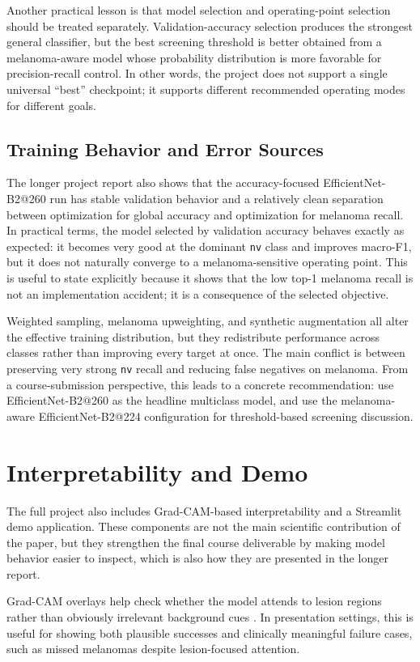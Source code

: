 \documentclass[conference]{IEEEtran}
\begin{document}
Another practical lesson is that model selection and operating-point selection should be treated separately. Validation-accuracy selection produces the strongest general classifier, but the best screening threshold is better obtained from a melanoma-aware model whose probability distribution is more favorable for precision-recall control. In other words, the project does not support a single universal ``best'' checkpoint; it supports different recommended operating modes for different goals.

\subsection{Training Behavior and Error Sources}
The longer project report also shows that the accuracy-focused EfficientNet-B2@260 run has stable validation behavior and a relatively clean separation between optimization for global accuracy and optimization for melanoma recall. In practical terms, the model selected by validation accuracy behaves exactly as expected: it becomes very good at the dominant \texttt{nv} class and improves macro-F1, but it does not naturally converge to a melanoma-sensitive operating point. This is useful to state explicitly because it shows that the low top-1 melanoma recall is not an implementation accident; it is a consequence of the selected objective.

Weighted sampling, melanoma upweighting, and synthetic augmentation all alter the effective training distribution, but they redistribute performance across classes rather than improving every target at once. The main conflict is between preserving very strong \texttt{nv} recall and reducing false negatives on melanoma. From a course-submission perspective, this leads to a concrete recommendation: use EfficientNet-B2@260 as the headline multiclass model, and use the melanoma-aware EfficientNet-B2@224 configuration for threshold-based screening discussion.

\section{Interpretability and Demo}
The full project also includes Grad-CAM-based interpretability and a Streamlit demo application. These components are not the main scientific contribution of the paper, but they strengthen the final course deliverable by making model behavior easier to inspect, which is also how they are presented in the longer report.

Grad-CAM overlays help check whether the model attends to lesion regions rather than obviously irrelevant background cues \cite{selvaraju2017gradcam}. In presentation settings, this is useful for showing both plausible successes and clinically meaningful failure cases, such as missed melanomas despite lesion-focused attention.
\end{document}
